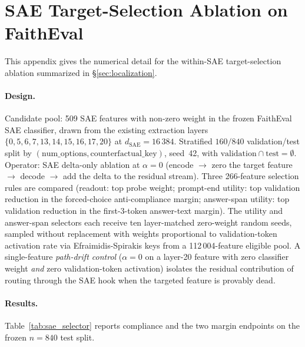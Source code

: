 \documentclass{article}
\begin{document}
\section{SAE Target-Selection Ablation on FaithEval}
\label{app:saeselector}

This appendix gives the numerical detail for the within-SAE target-selection ablation summarized in \S\ref{sec:localization}.

\paragraph{Design.}
Candidate pool: 509 SAE features with non-zero weight in the frozen FaithEval SAE classifier, drawn from the existing extraction layers $\{0, 5, 6, 7, 13, 14, 15, 16, 17, 20\}$ at $d_{\text{SAE}} = 16\,384$.
Stratified $160/840$ validation/test split by $(\text{num\_options}, \text{counterfactual\_key})$, seed~42, with $\text{validation} \cap \text{test} = \emptyset$.
Operator: SAE delta-only ablation at $\alpha = 0$ (encode $\to$ zero the target feature $\to$ decode $\to$ add the delta to the residual stream).
Three 266-feature selection rules are compared (readout: top probe weight; prompt-end utility: top validation reduction in the forced-choice anti-compliance margin; answer-span utility: top validation reduction in the first-3-token answer-text margin).
The utility and answer-span selectors each receive ten layer-matched zero-weight random seeds, sampled without replacement with weights proportional to validation-token activation rate via Efraimidis-Spirakis keys from a 112\,004-feature eligible pool.
A single-feature \emph{path-drift control} ($\alpha = 0$ on a layer-20 feature with zero classifier weight \emph{and} zero validation-token activation) isolates the residual contribution of routing through the SAE hook when the targeted feature is provably dead.

\paragraph{Results.} Table~\ref{tab:sae_selector} reports compliance and the two margin endpoints on the frozen $n = 840$ test split.
\end{document}
